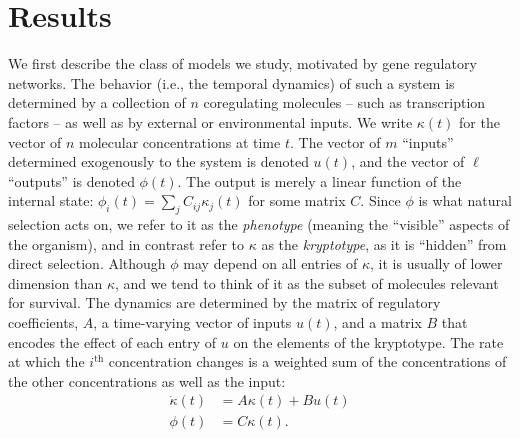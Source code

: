 \documentclass{article}
\newcommand{\1}{\mathbbm{1}}
\begin{document}
\section*{Results}

We first describe the class of models we study, motivated by gene regulatory networks. 
The behavior (i.e., the temporal dynamics) of such a system is determined by a collection of $n$ coregulating molecules 
-- such as transcription factors -- as well as by external or environmental inputs.
We write $\kappa(t)$ for the vector of $n$ molecular concentrations at time $t$.
The vector of $m$ ``inputs'' determined exogenously to the system is denoted $u(t)$,
and the vector of $\ell$ ``outputs'' is denoted $\phi(t)$.
The output is merely a linear function of the internal state:
$\phi_i(t) = \sum_j C_{ij} \kappa_j(t)$
for some matrix $C$.
Since $\phi$ is what natural selection acts on, we refer to it as the \emph{phenotype}
(meaning the ``visible'' aspects of the organism),
and in contrast refer to $\kappa$ as the \emph{kryptotype},
as it is ``hidden'' from direct selection.
Although $\phi$ may depend on all entries of $\kappa$,
it is usually of lower dimension than $\kappa$,
and we tend to think of it as the subset of molecules relevant for survival.
The dynamics are determined by
the matrix of regulatory coefficients, $A$,
a time-varying vector of inputs $u(t)$,
and a matrix $B$ that encodes the effect of each entry of $u$ on the elements of the kryptotype.
The rate at which the $i^\text{th}$ concentration changes
is a weighted sum of the concentrations of the other concentrations
as well as the input:
\begin{equation}\label{eqn:system}
   \begin{aligned}
    \dot{\kappa}(t) &= A \kappa(t) + B u(t) \\
    \phi(t) &= C \kappa(t) .
  \end{aligned} 
\end{equation}
\end{document}
